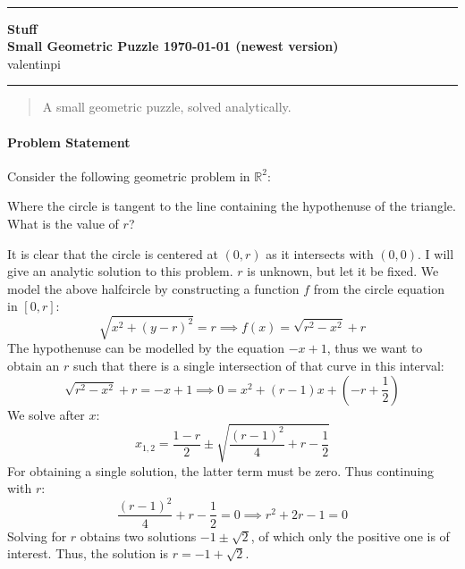\documentclass[10pt]{article}
\theoremstyle{definition}
\theoremstyle{remark}
\newcommand{\Authors}{valentinpi}
\begin{document}
\vspace*{-12ex}
\phantom{}\\
\noindent\rule{\textwidth}{0.1pt}
\large \textbf{Stuff} \vspace*{0.25cm}\\
\normalsize \textbf{Small Geometric Puzzle \hfill \today { (newest version)}}\\
\Authors\\
\noindent\rule{\textwidth}{0.1pt}

\begin{abstract}
    \noindent A small geometric puzzle, solved analytically.
\end{abstract}

\vspace{\baselineskip}

\paragraph{Problem Statement} Consider the following geometric problem in \(\mathbb{R}^2\):

\begin{minipage}{\linewidth}
    \centering
    \vspace{0.25cm}
    \vspace{0.25cm}
\end{minipage}

Where the circle is tangent to the line containing the hypothenuse of the triangle. What is the value of \(r\)?

It is clear that the circle is centered at \((0, r)\) as it intersects with \((0, 0)\). I will give an analytic solution to this problem. \(r\) is unknown, but let it be fixed. We model the above halfcircle by constructing a function \(f\) from the circle equation in \([0, r]\):
\[
    \sqrt{x^2+(y-r)^2} = r \implies f(x) = \sqrt{r^2-x^2}+r
\]
The hypothenuse can be modelled by the equation \(-x+1\), thus we want to obtain an \(r\) such that there is a single intersection of that curve in this interval:
\[
    \sqrt{r^2-x^2}+r = -x + 1 \implies 0 = x^2 + (r-1)x + \left(-r+\frac{1}{2}\right)
\]
We solve after \(x\):
\[
    x_{1,2} = \frac{1-r}{2} \pm \sqrt{\frac{(r-1)^2}{4}+r-\frac{1}{2}}
\]
For obtaining a single solution, the latter term must be zero. Thus continuing with \(r\):
\[
    \frac{(r-1)^2}{4}+r-\frac{1}{2} = 0 \implies r^2+2r-1=0
\]
Solving for \(r\) obtains two solutions \(-1 \pm \sqrt{2}\), of which only the positive one is of interest. Thus, the solution is \(r = -1 + \sqrt{2}\).
\end{document}
